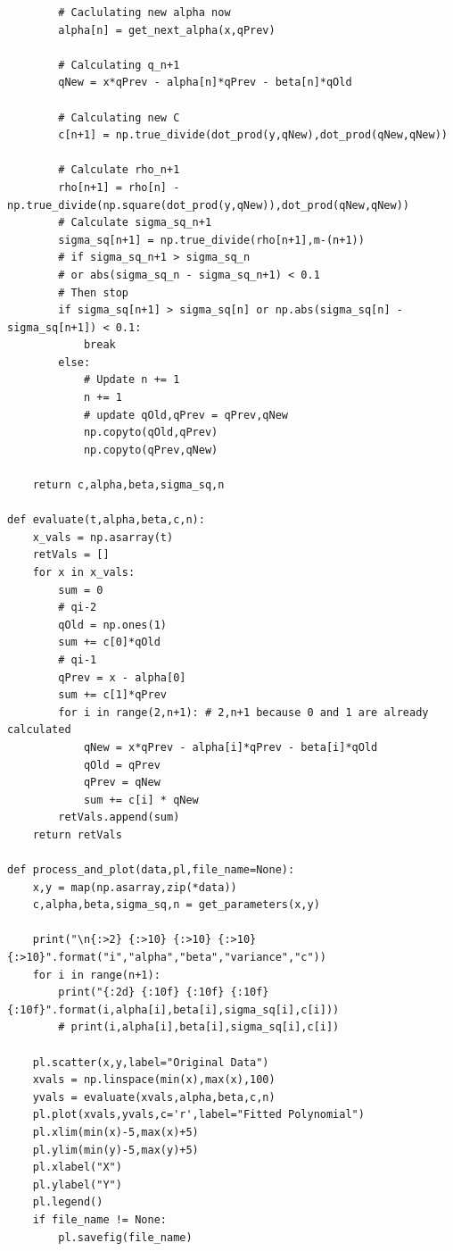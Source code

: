 \documentclass[a4paper,11pt]{article}
\begin{document}
{\begin{lstlisting}
        # Caclulating new alpha now
        alpha[n] = get_next_alpha(x,qPrev)

        # Calculating q_n+1
        qNew = x*qPrev - alpha[n]*qPrev - beta[n]*qOld

        # Calculating new C
        c[n+1] = np.true_divide(dot_prod(y,qNew),dot_prod(qNew,qNew))

        # Calculate rho_n+1
        rho[n+1] = rho[n] - np.true_divide(np.square(dot_prod(y,qNew)),dot_prod(qNew,qNew))
        # Calculate sigma_sq_n+1
        sigma_sq[n+1] = np.true_divide(rho[n+1],m-(n+1))
        # if sigma_sq_n+1 > sigma_sq_n 
        # or abs(sigma_sq_n - sigma_sq_n+1) < 0.1
        # Then stop
        if sigma_sq[n+1] > sigma_sq[n] or np.abs(sigma_sq[n] - sigma_sq[n+1]) < 0.1:
            break
        else:
            # Update n += 1
            n += 1
            # update qOld,qPrev = qPrev,qNew
            np.copyto(qOld,qPrev)
            np.copyto(qPrev,qNew)
    
    return c,alpha,beta,sigma_sq,n

def evaluate(t,alpha,beta,c,n):
    x_vals = np.asarray(t)
    retVals = []
    for x in x_vals:
        sum = 0
        # qi-2
        qOld = np.ones(1)
        sum += c[0]*qOld
        # qi-1
        qPrev = x - alpha[0]
        sum += c[1]*qPrev
        for i in range(2,n+1): # 2,n+1 because 0 and 1 are already calculated
            qNew = x*qPrev - alpha[i]*qPrev - beta[i]*qOld
            qOld = qPrev
            qPrev = qNew
            sum += c[i] * qNew
        retVals.append(sum)
    return retVals

def process_and_plot(data,pl,file_name=None):
    x,y = map(np.asarray,zip(*data))
    c,alpha,beta,sigma_sq,n = get_parameters(x,y)
    
    print("\n{:>2} {:>10} {:>10} {:>10} {:>10}".format("i","alpha","beta","variance","c"))
    for i in range(n+1):
        print("{:2d} {:10f} {:10f} {:10f} {:10f}".format(i,alpha[i],beta[i],sigma_sq[i],c[i]))
        # print(i,alpha[i],beta[i],sigma_sq[i],c[i])

    pl.scatter(x,y,label="Original Data")
    xvals = np.linspace(min(x),max(x),100)
    yvals = evaluate(xvals,alpha,beta,c,n)
    pl.plot(xvals,yvals,c='r',label="Fitted Polynomial")
    pl.xlim(min(x)-5,max(x)+5)
    pl.ylim(min(y)-5,max(y)+5)
    pl.xlabel("X")
    pl.ylabel("Y")
    pl.legend()
    if file_name != None:
        pl.savefig(file_name)


\end{lstlisting}}
\end{document}
